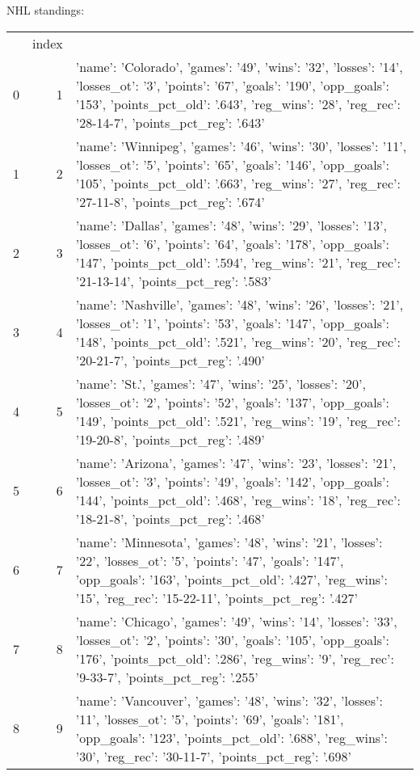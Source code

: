NHL standings:
\begin{tabular}{lrl}
 & index &  \\
0 & 1 & {'name': 'Colorado', 'games': '49', 'wins': '32', 'losses': '14', 'losses_ot': '3', 'points': '67', 'goals': '190', 'opp_goals': '153', 'points_pct_old': '.643', 'reg_wins': '28', 'reg_rec': '28-14-7', 'points_pct_reg': '.643'} \\
1 & 2 & {'name': 'Winnipeg', 'games': '46', 'wins': '30', 'losses': '11', 'losses_ot': '5', 'points': '65', 'goals': '146', 'opp_goals': '105', 'points_pct_old': '.663', 'reg_wins': '27', 'reg_rec': '27-11-8', 'points_pct_reg': '.674'} \\
2 & 3 & {'name': 'Dallas', 'games': '48', 'wins': '29', 'losses': '13', 'losses_ot': '6', 'points': '64', 'goals': '178', 'opp_goals': '147', 'points_pct_old': '.594', 'reg_wins': '21', 'reg_rec': '21-13-14', 'points_pct_reg': '.583'} \\
3 & 4 & {'name': 'Nashville', 'games': '48', 'wins': '26', 'losses': '21', 'losses_ot': '1', 'points': '53', 'goals': '147', 'opp_goals': '148', 'points_pct_old': '.521', 'reg_wins': '20', 'reg_rec': '20-21-7', 'points_pct_reg': '.490'} \\
4 & 5 & {'name': 'St.', 'games': '47', 'wins': '25', 'losses': '20', 'losses_ot': '2', 'points': '52', 'goals': '137', 'opp_goals': '149', 'points_pct_old': '.521', 'reg_wins': '19', 'reg_rec': '19-20-8', 'points_pct_reg': '.489'} \\
5 & 6 & {'name': 'Arizona', 'games': '47', 'wins': '23', 'losses': '21', 'losses_ot': '3', 'points': '49', 'goals': '142', 'opp_goals': '144', 'points_pct_old': '.468', 'reg_wins': '18', 'reg_rec': '18-21-8', 'points_pct_reg': '.468'} \\
6 & 7 & {'name': 'Minnesota', 'games': '48', 'wins': '21', 'losses': '22', 'losses_ot': '5', 'points': '47', 'goals': '147', 'opp_goals': '163', 'points_pct_old': '.427', 'reg_wins': '15', 'reg_rec': '15-22-11', 'points_pct_reg': '.427'} \\
7 & 8 & {'name': 'Chicago', 'games': '49', 'wins': '14', 'losses': '33', 'losses_ot': '2', 'points': '30', 'goals': '105', 'opp_goals': '176', 'points_pct_old': '.286', 'reg_wins': '9', 'reg_rec': '9-33-7', 'points_pct_reg': '.255'} \\
8 & 9 & {'name': 'Vancouver', 'games': '48', 'wins': '32', 'losses': '11', 'losses_ot': '5', 'points': '69', 'goals': '181', 'opp_goals': '123', 'points_pct_old': '.688', 'reg_wins': '30', 'reg_rec': '30-11-7', 'points_pct_reg': '.698'} \\

\end{tabular}
